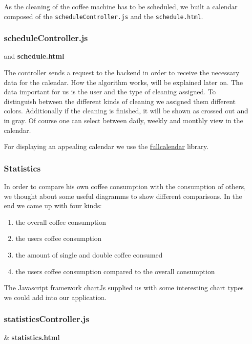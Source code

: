 As the cleaning of the coffee machine has to be scheduled, we built a
calendar composed of the \texttt{scheduleController.js} and the
\texttt{schedule.html}.

\subsubsection*{scheduleController.js} and \textbf{schedule.html}

The controller sends a request to the backend in order to receive the
necessary data for the calendar. How the algorithm works, will be
explained later on. The data important for us is the user and the type
of cleaning assigned. To distinguish between the different kinds of
cleaning we assigned them different colors. Additionally if the cleaning
is finished, it will be shown as crossed out and in gray. Of course one
can select between daily, weekly and monthly view in the calendar.

For displaying an appealing calendar we use the
\href{http://fullcalendar.io/}{fullcalendar} library.

\subsubsection{Statistics}\label{statistics}

In order to compare his own coffee consumption with the consumption of
others, we thought about some useful diagramms to show different
comparisons. In the end we came up with four kinds:

\begin{enumerate}
\def\labelenumi{\arabic{enumi}.}
\item
  the overall coffee consumption
\item
  the users coffee consumption
\item
  the amount of single and double coffee consumed
\item
  the users coffee consumption compared to the overall consumption
\end{enumerate}

The Javascript framework \href{chartjs.org/docs/}{chartJs} supplied us
with some interesting chart types we could add into our application.

\subsubsection*{statisticsController.js} \& \textbf{statistics.html}


